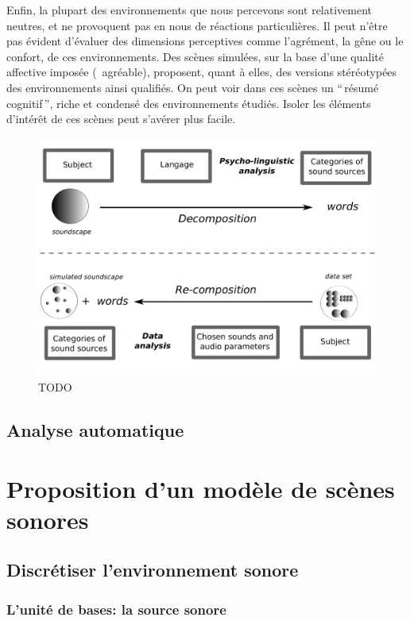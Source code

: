 \begin{itemize}
Enfin, la plupart des environnements que nous percevons sont relativement neutres, et ne provoquent pas en nous de réactions particulières. Il peut n'être pas évident d'évaluer des dimensions perceptives comme l'agrément, la gêne ou le confort, de ces environnements. Des scènes simulées, sur la base d'une qualité affective imposée (\eg~agréable), proposent, quant à elles, des versions stéréotypées des environnements ainsi qualifiés. On peut voir dans ces scènes un ``\,résumé cognitif\,'', riche et condensé des environnements étudiés. Isoler les éléments d'intérêt de ces scènes peut s'avérer plus facile.

\end{itemize}

\begin{figure}[t]
        \myfloatalign
        \includegraphics[width=.8\linewidth]{gfx/1}
       \caption{TODO}\label{fig:paradigmeSimu1}
\end{figure}

\subsection{Analyse automatique}

\section{Proposition d'un modèle de scènes sonores}
\label{sec:ch4_model}

\subsection{Discrétiser l'environnement sonore}
\label{sec:ch4_modelInspi}


\subsubsection{L'unité de bases: la source sonore}

